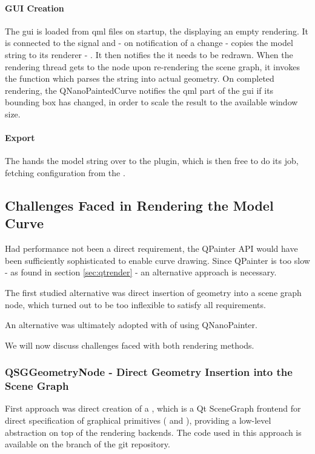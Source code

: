 \paragraph{GUI Creation} The \gls{gui} is loaded from \gls{qml} files on startup, the  displaying an empty rendering. It is connected to the  signal and - on notification of a change - copies the model string to its renderer - . It then notifies the  it needs to be redrawn. When the rendering thread gets to the  node upon re-rendering the scene graph, it invokes the  function which parses the string into actual geometry. On completed rendering, the QNanoPaintedCurve notifies the \gls{qml} part of the \gls{gui} if its \gls{bounding box} has changed, in order to scale the result to the available window size.

\paragraph{Export} The  hands the model string over to the plugin, which is then free to do its job, fetching configuration from the .

\subsection{Challenges Faced in Rendering the Model Curve}
Had performance not been a direct requirement, the QPainter API would have been sufficiently sophisticated to enable curve drawing. Since QPainter is too slow - as found in section \ref{sec:qtrender} - an alternative approach is necessary.

The first studied alternative was direct insertion of geometry into a  scene graph node, which turned out to be too inflexible to satisfy all requirements.

An alternative was ultimately adopted with of using QNanoPainter.

We will now discuss challenges faced with both rendering methods.

\subsubsection{QSGGeometryNode - Direct Geometry Insertion into the Scene Graph}\label{sec:impldirect}

First approach was direct creation of a , which is a Qt SceneGraph frontend for direct specification of graphical primitives ( and ), providing a low-level abstraction on top of the rendering backends.
The code used in this approach is available on the  branch of the \gls{git} repository.

